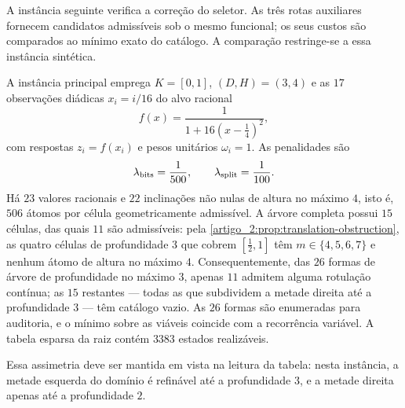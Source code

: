 A instância seguinte verifica a correção do seletor. As três rotas auxiliares fornecem candidatos admissíveis sob o mesmo funcional; os seus custos são comparados ao mínimo exato do catálogo. A comparação restringe-se a essa instância sintética.

A instância principal emprega $K=[0,1]$, $(D,H)=(3,4)$ e as $17$ observações
diádicas $x_i=i/16$ do alvo racional
\begin{equation}
 f(x)=\frac{1}{1+16(x-\tfrac14)^2},
 \label{artigo_2:eq:experiment-target}
\end{equation}
com respostas $z_i=f(x_i)$ e pesos unitários $\omega_i=1$. As penalidades são
\[
 \lambda_{\rm bits}=\frac1{500},
 \qquad
 \lambda_{\rm split}=\frac1{100}.
\]
Há $23$ valores racionais e $22$ inclinações não nulas de altura no máximo
$4$, isto é, $506$ átomos por célula geometricamente admissível. A árvore
completa possui $15$ células, das quais $11$ são admissíveis: pela
\cref{artigo_2:prop:translation-obstruction}, as quatro células de profundidade $3$ que
cobrem $[\tfrac12,1]$ têm $m\in\{4,5,6,7\}$ e nenhum átomo de altura no
máximo $4$. Consequentemente, das $26$ formas de árvore de profundidade no
máximo $3$, apenas $11$ admitem alguma rotulação contínua; as $15$ restantes
--- todas as que subdividem a metade direita até a profundidade $3$ --- têm
catálogo vazio. As $26$ formas são enumeradas para auditoria, e o mínimo sobre
as viáveis coincide com a recorrência variável. A tabela esparsa da raiz
contém $3383$ estados realizáveis.

Essa assimetria deve ser mantida em vista na leitura da tabela: nesta instância, a
metade esquerda do domínio é refinável até a profundidade $3$, e a metade
direita apenas até a profundidade $2$.

